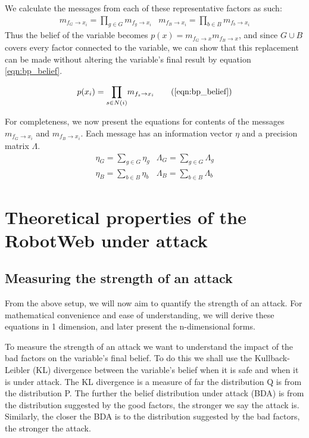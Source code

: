 We calculate the messages from each of these representative factors as such:
\begin{eqnarray}
	m_{f_G \rightarrow x_i} = \underset{g \in G}{\prod} m_{f_g \rightarrow x_i}&
	m_{f_B \rightarrow x_i} = \underset{b \in B}{\prod} m_{f_b \rightarrow x_i}
\end{eqnarray}
Thus the belief of the variable becomes $p(x) = m_{f_G \rightarrow x} m_{f_B \rightarrow x}$, and since $G \cup B$ covers every factor connected to the variable, we can show that this replacement can be made without altering the variable's final result by equation \ref{eqn:bp_belief}.

\begin{equation}
	p(x_i) = \underset{s \in N(i)}{\prod} m_{f_s \rightarrow x_i}
	\tag{\ref{eqn:bp_belief}}
\end{equation}

For completeness, we now present the equations for contents of the messages $m_{f_G \rightarrow x_i}$ and $m_{f_B \rightarrow x_i}$. 
Each message has an information vector $\eta$ and a precision matrix $\Lambda$.
\begin{eqnarray}
	\eta_G = \underset{g \in G}{\sum} \eta_g&
	\Lambda_G = \underset{g \in G}{\sum} \Lambda_g \label{eqn:good_pull}\\
	\eta_B = \underset{b \in B}{\sum} \eta_b&
	\Lambda_B = \underset{b \in B}{\sum} \Lambda_b \label{eqn:bad_pull}
\end{eqnarray}

\section{Theoretical properties of the RobotWeb under attack}
\subsection{Measuring the strength of an attack}
From the above setup, we will now aim to quantify the strength of an attack. For mathematical convenience and ease of understanding, we will derive these equations in 1 dimension, and later present the n-dimensional forms.

To measure the strength of an attack we want to understand the impact of the bad factors on the variable's final belief. To do this we shall use the Kullback-Leibler (KL) divergence \citationneeded between the variable's belief when it is safe and when it is under attack.
The KL divergence is a measure of far the distribution Q is from the distribution P. The further the belief distribution under attack (BDA) is from the distribution suggested by the good factors, the stronger we say the attack is. Similarly, the closer the BDA is to the distribution suggested by the bad factors, the stronger the attack.

